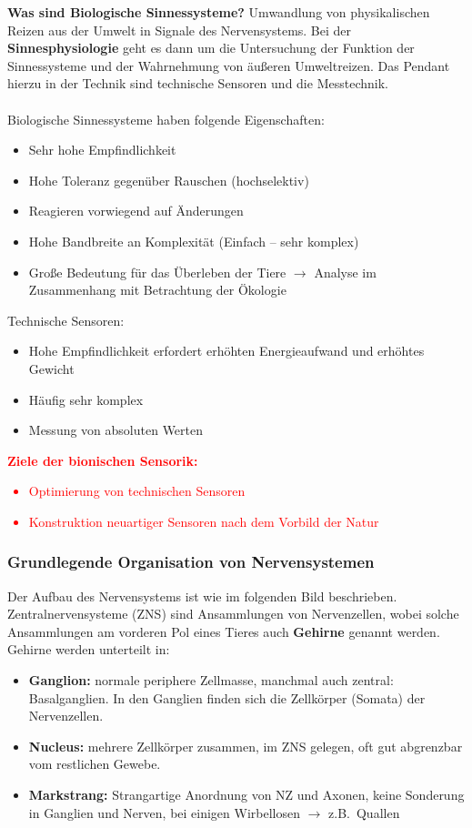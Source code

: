 \textbf{Was sind Biologische Sinnessysteme?} Umwandlung von physikalischen Reizen aus der Umwelt in Signale des Nervensystems. Bei der \textbf{Sinnesphysiologie} geht es dann um die Untersuchung der Funktion der Sinnessysteme und der Wahrnehmung von äußeren Umweltreizen. Das Pendant hierzu in der Technik sind technische Sensoren und die Messtechnik.
\\\\
Biologische Sinnessysteme haben folgende Eigenschaften:
\begin{itemize}
    \item Sehr hohe Empfindlichkeit
    \item Hohe Toleranz gegenüber Rauschen (hochselektiv)
    \item Reagieren vorwiegend auf Änderungen
    \item Hohe Bandbreite an Komplexität (Einfach – sehr komplex)
    \item Große Bedeutung für das Überleben der Tiere $\rightarrow$ Analyse im Zusammenhang mit Betrachtung der Ökologie
\end{itemize}
Technische Sensoren:
\begin{itemize}
    \item Hohe Empfindlichkeit erfordert erhöhten Energieaufwand und erhöhtes Gewicht
    \item Häufig sehr komplex
    \item Messung von absoluten Werten
\end{itemize}
\textcolor{red}{
\textbf{Ziele der bionischen Sensorik:}
\begin{itemize}
    \item Optimierung von technischen Sensoren
    \item Konstruktion neuartiger Sensoren nach dem
Vorbild der Natur
\end{itemize}
}

\subsubsection{Grundlegende Organisation von Nervensystemen}

Der Aufbau des Nervensystems ist wie im folgenden Bild beschrieben. Zentralnervensysteme (ZNS) sind Ansammlungen von Nervenzellen, wobei solche Ansammlungen am vorderen Pol eines Tieres auch \textbf{Gehirne} genannt werden. Gehirne werden unterteilt in:
\begin{itemize}
    \item \textbf{Ganglion:} normale periphere Zellmasse, manchmal auch zentral: Basalganglien. In den Ganglien finden sich die Zellkörper (Somata) der Nervenzellen.
    \item \textbf{Nucleus:} mehrere Zellkörper zusammen, im ZNS gelegen, oft gut abgrenzbar vom restlichen Gewebe.
    \item \textbf{Markstrang:} Strangartige Anordnung von NZ und Axonen, keine Sonderung in Ganglien und Nerven, bei einigen Wirbellosen $\rightarrow$ z.B.\ Quallen
\end{itemize}

